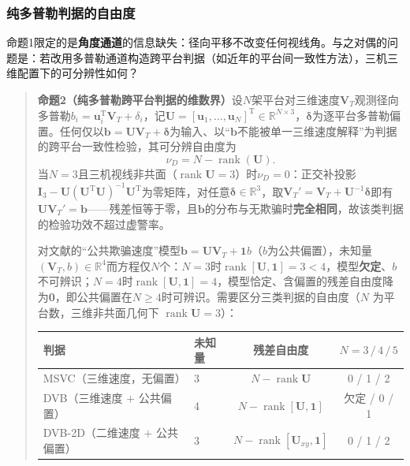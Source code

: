 \documentclass[UTF8,a4paper,zihao=-4]{ctexart}
\begin{document}
\subsubsection{纯多普勒判据的自由度}\label{sec:doppler-limit}
命题1限定的是\textbf{角度通道}的信息缺失：径向平移不改变任何视线角。与之对偶的问题是：若改用多普勒通道构造跨平台判据（如近年的平台间一致性方法），三机三维配置下的可分辨性如何？

\begin{quote}
\textbf{命题2（纯多普勒跨平台判据的维数界）}\quad 设\(N\)架平台对三维速度\(\boldsymbol V_T\)观测径向多普勒\(b_i=\boldsymbol u_i^{\mathrm T}\boldsymbol V_T+\delta_i\)，记\(\boldsymbol U=[\boldsymbol u_1,\dots,\boldsymbol u_N]^{\mathrm T}\in\mathbb R^{N\times3}\)，\(\boldsymbol\delta\)为逐平台多普勒偏置。任何仅以\(\boldsymbol b=\boldsymbol U\boldsymbol V_T+\boldsymbol\delta\)为输入、以“\(\boldsymbol b\)不能被单一三维速度解释”为判据的跨平台一致性检验，其可分辨自由度为
\begin{equation}
\nu_D=N-\operatorname{rank}(\boldsymbol U).
\label{eq:prop2-nu}
\end{equation}
当\(N=3\)且三机视线非共面（\(\operatorname{rank}\boldsymbol U=3\)）时\(\nu_D=0\)：正交补投影\(\boldsymbol I_3-\boldsymbol U(\boldsymbol U^{\mathrm T}\boldsymbol U)^{-1}\boldsymbol U^{\mathrm T}\)为零矩阵，对任意\(\boldsymbol\delta\in\mathbb R^3\)，取\(\boldsymbol V_T'=\boldsymbol V_T+\boldsymbol U^{-1}\boldsymbol\delta\)即有\(\boldsymbol U\boldsymbol V_T'=\boldsymbol b\)——残差恒等于零，且\(\boldsymbol b\)的分布与无欺骗时\textbf{完全相同}，故该类判据的检验功效不超过虚警率。

对文献\cite{li2024}的“公共欺骗速度”模型\(\boldsymbol b=\boldsymbol U\boldsymbol V_T+\mathbf 1 b\)（\(b\)为公共偏置），未知量\((\boldsymbol V_T,b)\in\mathbb R^4\)而方程仅\(N\)个：\(N=3\)时\(\operatorname{rank}[\boldsymbol U,\mathbf 1]=3<4\)，模型\textbf{欠定}、\(b\)不可辨识；\(N=4\)时\(\operatorname{rank}[\boldsymbol U,\mathbf 1]=4\)，模型恰定、含偏置的残差自由度降为\textbf{0}，即公共偏置在\(N\ge4\)时可辨识。需要区分三类判据的自由度（\(N\) 为平台数，三维非共面几何下 \(\operatorname{rank}\boldsymbol U=3\)）：

\begin{center}\small
\begin{tabular}{@{}llcc@{}}\toprule
判据 & 未知量 & 残差自由度 & \(N=3\,/\,4\,/\,5\) \\ \midrule
MSVC（三维速度，无偏置） & 3 & \(N-\operatorname{rank}\boldsymbol U\) & 0 / 1 / 2 \\
DVB（三维速度 $+$ 公共偏置） & 4 & \(N-\operatorname{rank}[\boldsymbol U,\mathbf 1]\) & 欠定 / 0 / 1 \\
DVB-2D（二维速度 $+$ 公共偏置） & 3 & \(N-\operatorname{rank}[\boldsymbol U_{xy},\mathbf 1]\) & 0 / 1 / 2 \\
\bottomrule\end{tabular}\end{center}


\end{quote}
\end{document}
